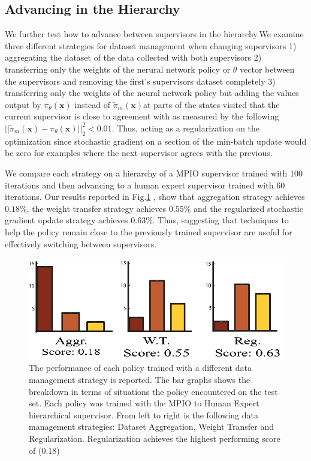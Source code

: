 \documentclass[10pt, conference]{ieeeconf}      %
\newcommand{\bx}{\mathbf{x}}
\begin{document}
\subsection{Advancing in the Hierarchy}
We further test how to advance between supervisors in the hierarchy.We examine three different strategies for dataset management when changing supervisors 1) aggregating the dataset of the data collected with both supervisors 2) transferring only the weights of the nerural network policy or $\theta$ vector between the supervisors and removing the first's supervisors dataset completely 3) transferring only the weights of the neural network policy but adding the values output by $\pi_\theta(\bx)$  instead of $\tilde{\pi}_m(\bx)$at parts of the states visited that the current supervisor is close to agreement with as measured by the following $||\tilde{\pi}_m(\bx) - \pi_\theta(\bx)||^2_2 < 0.01$. Thus, acting as a regularization on the optimization since stochastic gradient on a section of the min-batch update would be zero for examples where the next supervisor agrees with the previous. 


We compare each strategy on a hierarchy of a MPIO supervisor trained with 100 iterations and then advancing to a human expert supervisor trained with 60 iterations.  Our results reported in Fig.\ref{fig:cost_result} , show that aggregation strategy achieves $0.18\%$, the weight transfer strategy achieves $0.55\%$ and the regularized stochastic gradient update strategy achieves $0.63\%$. Thus, suggesting that techniques to help the policy remain close to the previously trained supervisor are useful for effectively switching between supervisors.   


\begin{figure}[t]


\includegraphics{f_figs/cost_result.eps}

\caption{\footnotesize The performance of each policy trained with a different data management strategy is reported. The bar graphs shows the breakdown in terms of situations the policy encountered on the test set. Each policy was trained with the MPIO to Human Expert hierarchical supervisor. From left to right is the following data management strategies: Dataset Aggregation, Weight Transfer and Regularization. Regularization achieves the highest performing score of (0.18) }
\vspace*{-20pt}
\label{fig:cost_result}
\end{figure}
\end{document}
